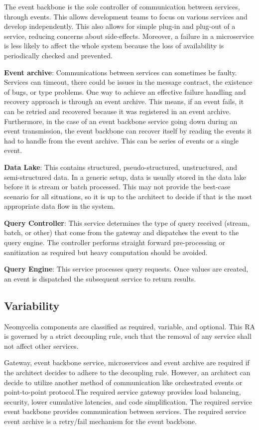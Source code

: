\documentclass[conference]{IEEEtran}
\begin{document}
The event backbone is the sole controller of communication between services, through events. This allows development teams to focus on various services and develop independently. This also allows for simple plug-in and plug-out of a service, reducing concerns about side-effects. Moreover, a failure in a microservice is less likely to affect the whole system because the loss of availability is periodically checked and prevented.

\textbf{Event archive}: Communications between services can sometimes be faulty. Services can timeout, there could be issues in the message contract, the existence of bugs, or type problems. One way to achieve an effective failure handling and recovery approach is through an event archive. This means, if an event fails, it can be retried and recovered because it was registered in an event archive. Furthermore, in the case of an event backbone service going down during an event transmission, the event backbone can recover itself by reading the events it had to handle from the event archive. This can be series of events or a single event.

\textbf{Data Lake}: This contains structured, pseudo-structured, unstructured, and semi-structured data. In a generic setup, data is usually stored in the data lake before it is stream or batch processed. This may not provide the best-case scenario for all situations, so it is up to the architect to decide if that is the most appropriate  data flow in the system.

\textbf{Query Controller}: This service determines the type of query received (stream, batch, or other) that come from the gateway and dispatches the event to the query engine. The controller performs straight forward pre-processing or sanitization as required but heavy computation should be avoided.

\textbf{Query Engine}: This service processes query requests. Once values are created, an event is dispatched the subsequent service to return results.

\subsection{Variability}
Neomycelia components are classified as required, variable, and optional. This RA is governed by a strict decoupling rule, such that the removal of any service shall not affect other services.

Gateway, event backbone service, microservices and event archive are required if the architect decides to adhere to the decoupling rule. However, an architect can decide to utilize another method of communication like orchestrated events or point-to-point protocol.The required service gateway provides load balancing, security, lower cumulative latencies, and code simplification. The required service event backbone provides communication between services. The required service event archive is a retry/fail mechanism for the event backbone.
\end{document}
